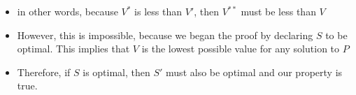 \documentclass[landscape]{slides}
\begin{document}
\begin{slide} %
	\begin{itemize}
		\item in other words, because $V^*$ is less than $V'$, then $V^{**}$ must
		be less than $V$
		\item However, this is impossible, because we began the proof by declaring
		$S$ to be optimal. This implies that $V$ is the lowest possible value for
		any solution to $P$
		\item Therefore, if $S$ is optimal, then $S'$ must also be optimal and our
		property is true.
	\end{itemize}
\end{slide}
\end{document}
